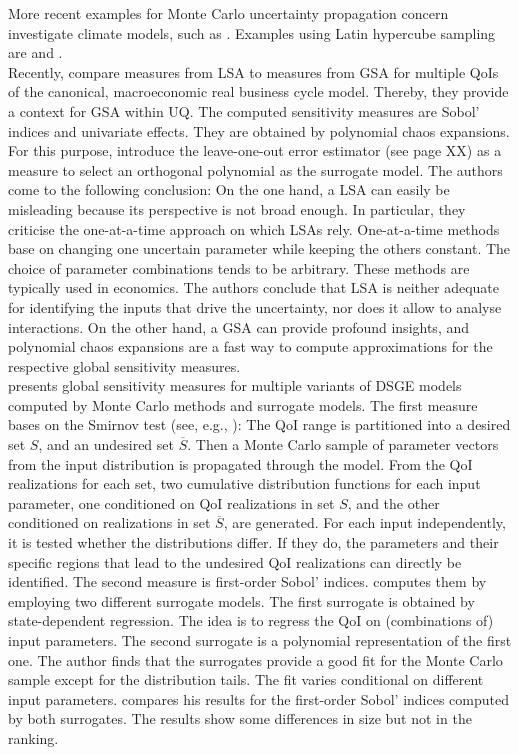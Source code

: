 \newline
More recent examples for Monte Carlo uncertainty propagation concern investigate climate models, such as \cite{Webster.2012}.
Examples using Latin hypercube sampling are \cite{Mattoo.2009} and \cite{Hope.2006}.\\
\newline
Recently, \cite{Harenberg.2019} compare measures from LSA to measures from GSA for multiple QoIs of the canonical, macroeconomic real business cycle model. Thereby, they provide a context for GSA within UQ. The computed sensitivity measures are Sobol' indices and univariate effects. They are obtained by polynomial chaos expansions. For this purpose, \citeauthor{Harenberg.2019} introduce the leave-one-out error estimator (see page XX) as a measure to select an orthogonal polynomial as the surrogate model. The authors come to the following conclusion: On the one hand, a LSA can easily be misleading because its perspective is not broad enough. In particular, they criticise the one-at-a-time approach on which LSAs rely. One-at-a-time methods base on changing one uncertain parameter while keeping the others constant. The choice of parameter combinations tends to be arbitrary. These methods are typically used in economics. The authors conclude that LSA is neither adequate for identifying the inputs that drive the uncertainty, nor does it allow to analyse interactions. On the other hand, a GSA can provide profound insights, and polynomial chaos expansions are a fast way to compute approximations for the respective global sensitivity measures.\\
\newline
\cite{Ratto.2008} presents global sensitivity measures for multiple variants of DSGE models computed by Monte Carlo methods and surrogate models. The first measure bases on the Smirnov test (see, e.g., \cite{Hornberger.1981}): The QoI range is partitioned into a desired set $S$, and an undesired set $\overline{S}$. Then a Monte Carlo sample of parameter vectors from the input distribution is propagated through the model. From the QoI realizations for each set, two cumulative distribution functions for each input parameter, one conditioned on QoI realizations in set $S$, and the other conditioned on realizations in set $\overline{S}$, are generated. For each input independently, it is tested whether the distributions differ. If they do, the parameters and their specific regions that lead to the undesired QoI realizations can directly be identified. The second measure is first-order Sobol' indices. \citeauthor{Ratto.2008} computes them by employing two different surrogate models. The first surrogate is obtained by state-dependent regression. The idea is to regress the QoI on (combinations of) input parameters. The second surrogate is a polynomial representation of the first one. The author finds that the surrogates provide a good fit for the Monte Carlo sample except for the distribution tails. The fit varies conditional on different input parameters. \citeauthor{Ratto.2008} compares his results for the first-order Sobol' indices computed by both surrogates. The results show some differences in size but not in the ranking.\\
